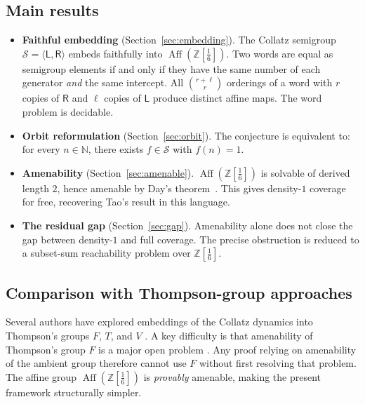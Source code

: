 \documentclass[12pt, a4paper]{amsart}
\theoremstyle{plain}
\theoremstyle{definition}
\theoremstyle{remark}
\newcommand{\N}{\mathbb{N}}
\newcommand{\Z}{\mathbb{Z}}
\newcommand{\Zs}{\Z[\tfrac{1}{6}]}
\newcommand{\Aff}{\operatorname{Aff}}
\newcommand{\wL}{\mathsf{L}}
\newcommand{\wR}{\mathsf{R}}
\begin{document}
\subsection*{Main results}

\begin{itemize}
  \item \textbf{Faithful embedding} (Section~\ref{sec:embedding}).
        The Collatz semigroup $\mathcal{S}=\langle\wL,\wR\rangle$ embeds
        faithfully into $\Aff(\Zs)$.  Two words are equal as semigroup
        elements if and only if they have the same number of each
        generator \emph{and} the same intercept.  All
        $\binom{r+\ell}{r}$ orderings of a word with $r$ copies of
        $\wR$ and $\ell$ copies of $\wL$ produce distinct affine maps.
        The word problem is decidable.

  \item \textbf{Orbit reformulation} (Section~\ref{sec:orbit}).
        The conjecture is equivalent to: for every $n\in\N$, there
        exists $f\in\mathcal{S}$ with $f(n)=1$.

  \item \textbf{Amenability} (Section~\ref{sec:amenable}).
        $\Aff(\Zs)$ is solvable of derived length $2$, hence amenable
        by Day's theorem~\cite{Day1957}.  This gives density-$1$
        coverage for free, recovering Tao's result in this language.

  \item \textbf{The residual gap} (Section~\ref{sec:gap}).
        Amenability alone does not close the gap between density-$1$
        and full coverage.  The precise obstruction is reduced to a
        subset-sum reachability problem over $\Zs$.
\end{itemize}

\subsection*{Comparison with Thompson-group approaches}

Several authors have explored embeddings of the Collatz dynamics into
Thompson's groups $F$, $T$, and $V$
\cite{Cleary2000,BrunnerSidki1999}.  A key difficulty is that
amenability of Thompson's group $F$ is a major open problem
\cite{BelkBrown2005,Haagerup2016}.  Any proof relying on amenability
of the ambient group therefore cannot use $F$ without first resolving
that problem.  The affine group $\Aff(\Zs)$ is \emph{provably} amenable,
making the present framework structurally simpler.
\end{document}
